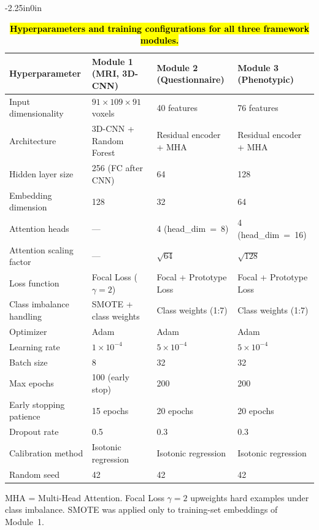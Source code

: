 \documentclass[10pt,letterpaper]{article}
\newcommand{\hlpar}[1]{\leavevmode\colorbox{yellow!30}{\parbox{\dimexpr\linewidth-2\fboxsep\relax}{#1}}\vspace{2pt}}
\begin{document}
                                                                                                                          \begin{table}[!t]
\begin{adjustwidth}{-2.25in}{0in}
\centering
\caption{\textbf{\hl{Hyperparameters and training configurations for all three framework modules.}}}
\label{tab:hyperparams}
\footnotesize
\renewcommand{\arraystretch}{1.15}
\begin{tabular}{|p{3.5cm}|p{3.5cm}|p{3.5cm}|p{3.5cm}|}
\hline
\textbf{Hyperparameter} & \textbf{Module 1 (MRI, 3D-CNN)} & \textbf{Module 2 (Questionnaire)} & \textbf{Module 3 (Phenotypic)} \\
\hline
Input dimensionality & $91 \times 109 \times 91$ voxels & 40 features & 76 features \\
\hline
Architecture & 3D-CNN + Random Forest & Residual encoder + MHA & Residual encoder + MHA \\
\hline
Hidden layer size & 256 (FC after CNN) & 64 & 128 \\
\hline
Embedding dimension & 128 & 32 & 64 \\
\hline
Attention heads & --- & 4 (head\_dim~=~8) & 4 (head\_dim~=~16) \\
\hline
Attention scaling factor & --- & $\sqrt{64}$ & $\sqrt{128}$ \\
\hline
Loss function & Focal Loss ($\gamma = 2$) & Focal + Prototype Loss & Focal + Prototype Loss \\
\hline
Class imbalance handling & SMOTE + class weights & Class weights (1:7) & Class weights (1:7) \\
\hline
Optimizer & Adam & Adam & Adam \\
\hline
Learning rate & $1 \times 10^{-4}$ & $5 \times 10^{-4}$ & $5 \times 10^{-4}$ \\
\hline
Batch size & 8 & 32 & 32 \\
\hline
Max epochs & 100 (early stop) & 200 & 200 \\
\hline
Early stopping patience & 15 epochs & 20 epochs & 20 epochs \\
\hline
Dropout rate & 0.5 & 0.3 & 0.3 \\
\hline
Calibration method & Isotonic regression & Isotonic regression & Isotonic regression \\
\hline
Random seed & 42 & 42 & 42 \\
\hline
\end{tabular}
\begin{flushleft}
\hlpar{MHA = Multi-Head Attention. Focal Loss $\gamma = 2$ upweights hard examples under class imbalance. SMOTE was applied only to training-set embeddings of Module~1.}
\end{flushleft}
\end{adjustwidth}
\end{table}
\end{document}
